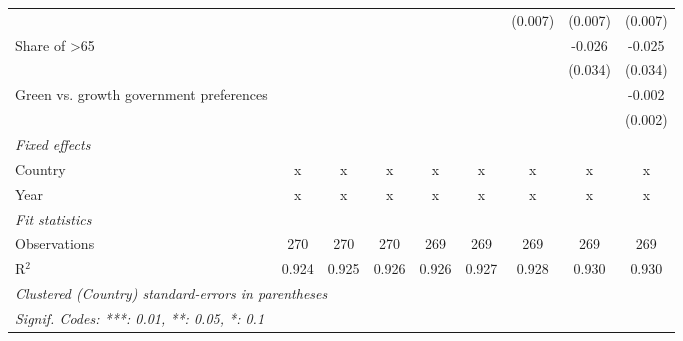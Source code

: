 \begin{table}[htbp]
\begin{tabular}{lcccccccc}
                                                  &         &         &         &         &         & (0.007) & (0.007) & (0.007)\\   
      Share of >65                                &         &         &         &         &         &         & -0.026  & -0.025\\   
                                                  &         &         &         &         &         &         & (0.034) & (0.034)\\   
      Green vs. growth government preferences     &         &         &         &         &         &         &         & -0.002\\   
                                                  &         &         &         &         &         &         &         & (0.002)\\   
      \emph{Fixed effects}\\
      Country                                     & x       & x       & x       & x       & x       & x       & x       & x\\  
      Year                                        & x       & x       & x       & x       & x       & x       & x       & x\\  
      \midrule \emph{Fit statistics}\\
      Observations                                & 270     & 270     & 270     & 269     & 269     & 269     & 269     & 269\\  
      R$^2$                                       & 0.924   & 0.925   & 0.926   & 0.926   & 0.927   & 0.928   & 0.930   & 0.930\\  
      \midrule
      \multicolumn{9}{l}{\emph{Clustered (Country) standard-errors in parentheses}}\\
      \multicolumn{9}{l}{\emph{Signif. Codes: ***: 0.01, **: 0.05, *: 0.1}}\\
   \end{tabular}
\end{table}



